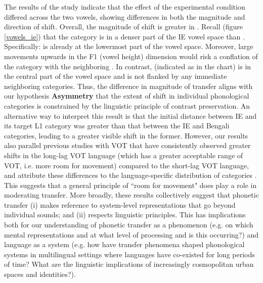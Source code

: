 \documentclass[12 pt]{article}
\newcommand{\nt}[1]{\textipa{[#1]}} %
\begin{document}
The results of the study indicate that the effect of the experimental condition differed across the two vowels, showing differences in both the magnitude and direction of shift. Overall, the magnitude of shift is greater in \nt{2}. Recall (figure \ref{vowels_ie}) that the category \nt{\ae} is in a denser part of the IE vowel space than \nt{2}. Specifically: \nt{\ae} is already at the lowermost part of the vowel space. Moreover, large movements upwards in the F1 (vowel height) dimension would risk a conflation of the category with the neighboring \nt{E}. In contrast, \nt{2} (indicated as \nt{@} in the chart) is in the central part of the vowel space and is not flanked by any immediate neighboring categories. Thus, the difference in magnitude of transfer aligns with our hypothesis \textbf{Asymmetry} that the extent of shift in individual phonological categories is constrained by the linguistic principle of contrast preservation. An alternative way to interpret this result is that the initial distance between IE \nt{2} and its target L1 category \nt{a:} was greater than that between the IE and Bengali \nt{\ae} categories, leading to a greater visible shift in the former. However, our results also parallel previous studies with VOT that have consistently observed greater shifts in the long-lag VOT language (which has a greater acceptable range of VOT, i.e. more room for movement) compared to the short-lag VOT language, and attribute these differences to the language-specific distribution of categories \citep{antoniou2011inter, bullock2009trying}. This suggests that a general principle of ``room for movement" does play a role in moderating transfer. More broadly, these results collectively suggest that phonetic transfer (i) makes reference to system-level representations that go beyond individual sounds; and (ii) respects linguistic principles. This has implications both for our understanding of phonetic transfer as a phenomenon (e.g. on which mental representations and at what level of processing and is this occurring?) and language as a system (e.g. how have transfer phenomena shaped phonological systems in multilingual settings where languages have co-existed for long periods of time? What are the linguistic implications of increasingly cosmopolitan urban spaces and identities?).
\end{document}
